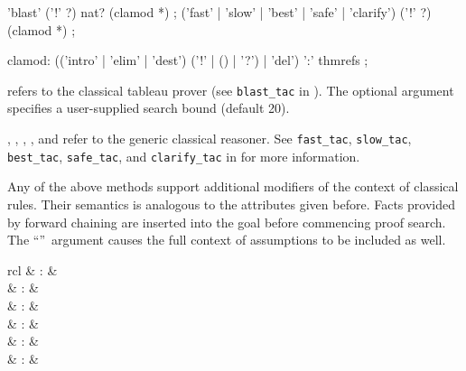 \begin{isabellebody}
\begin{isamarkuptext}
  \begin{rail}
    'blast' ('!' ?) nat? (clamod *)
    ;
    ('fast' | 'slow' | 'best' | 'safe' | 'clarify') ('!' ?) (clamod *)
    ;

    clamod: (('intro' | 'elim' | 'dest') ('!' | () | '?') | 'del') ':' thmrefs
    ;
  \end{rail}

  \begin{descr}

  \item [\hyperlink{method.blast}{\mbox{\isa{blast}}}] refers to the classical tableau prover (see
  \verb|blast_tac| in \cite[\S11]{isabelle-ref}).  The optional
  argument specifies a user-supplied search bound (default 20).

  \item [\hyperlink{method.fast}{\mbox{\isa{fast}}}, \hyperlink{method.slow}{\mbox{\isa{slow}}}, \hyperlink{method.best}{\mbox{\isa{best}}}, \hyperlink{method.safe}{\mbox{\isa{safe}}}, and \hyperlink{method.clarify}{\mbox{\isa{clarify}}}] refer to the generic classical
  reasoner.  See \verb|fast_tac|, \verb|slow_tac|, \verb|best_tac|, \verb|safe_tac|, and \verb|clarify_tac| in \cite[\S11]{isabelle-ref} for
  more information.

  \end{descr}

  Any of the above methods support additional modifiers of the context
  of classical rules.  Their semantics is analogous to the attributes
  given before.  Facts provided by forward chaining are inserted into
  the goal before commencing proof search.  The ``\isa{{\isachardoublequote}{\isacharbang}{\isachardoublequote}}''~argument causes the full context of assumptions to be
  included as well.%
\end{isamarkuptext}%
\isamarkuptrue%
%
\isamarkuptrue%
%
\begin{isamarkuptext}%
\begin{matharray}{rcl}
    \hypertarget{method.auto}{\hyperlink{method.auto}{\mbox{}}} & : & \isarmeth \\
    \hypertarget{method.force}{\hyperlink{method.force}{\mbox{}}} & : & \isarmeth \\
    \hypertarget{method.clarsimp}{\hyperlink{method.clarsimp}{\mbox{}}} & : & \isarmeth \\
    \hypertarget{method.fastsimp}{\hyperlink{method.fastsimp}{\mbox{}}} & : & \isarmeth \\
    \hypertarget{method.slowsimp}{\hyperlink{method.slowsimp}{\mbox{}}} & : & \isarmeth \\
    \hypertarget{method.bestsimp}{\hyperlink{method.bestsimp}{\mbox{}}} & : & \isarmeth \\
  \end{matharray}


\end{isamarkuptext}
\end{isabellebody}

